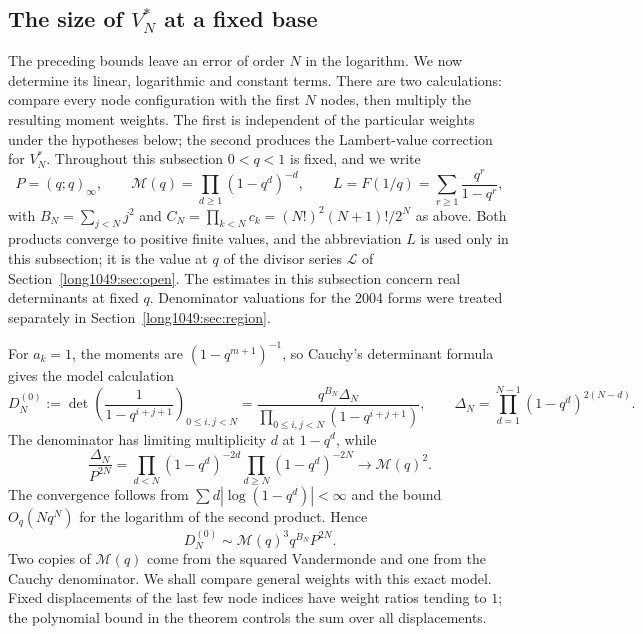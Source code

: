 \documentclass[11pt]{article}
\begin{document}
\subsection{The size of \texorpdfstring{$V_N^*$}{V(N)} at a fixed base}
\label{long1049:sec:sharp-fixed-base}

The preceding bounds leave an error of order $N$ in the logarithm.
We now determine its linear, logarithmic and constant terms. There
are two calculations: compare every node configuration with the
first $N$ nodes, then multiply the resulting moment weights.
The first is independent of the particular weights under the
hypotheses below; the second produces the Lambert-value correction
for $V_N^*$. Throughout this subsection $0<q<1$ is fixed, and we write
\[
 P=(q;q)_\infty,\qquad
 \mathcal M(q)=\prod_{d\ge1}(1-q^d)^{-d},\qquad
 L=F(1/q)=\sum_{r\ge1}\frac{q^r}{1-q^r},
\]
with $B_N=\sum_{j<N}j^2$ and $C_N=\prod_{k<N}c_k=(N!)^2(N+1)!/2^N$ as above.
Both products converge to positive finite values, and the abbreviation $L$ is
used only in this subsection; it is the value at $q$ of the divisor series
$\mathcal L$ of Section~\ref{long1049:sec:open}.
The estimates in this subsection concern real determinants at fixed
$q$. Denominator valuations for the 2004 forms were treated separately
in Section~\ref{long1049:sec:region}.

For $a_k=1$, the moments are $(1-q^{m+1})^{-1}$, so Cauchy's
determinant formula gives the model calculation
\begin{equation}\label{long1049:eq:cauchy-model}
 D_N^{(0)}:=\det\left(\frac1{1-q^{i+j+1}}\right)_{0\le i,j<N}
 =\frac{q^{B_N}\Delta_N}{\prod_{0\le i,j<N}(1-q^{i+j+1})},
 \qquad
 \Delta_N=\prod_{d=1}^{N-1}(1-q^d)^{2(N-d)}.
\end{equation}
The denominator has limiting multiplicity $d$ at $1-q^d$, while
\[
 \frac{\Delta_N}{P^{2N}}
 =\prod_{d<N}(1-q^d)^{-2d}\prod_{d\ge N}(1-q^d)^{-2N}
 \longrightarrow\mathcal M(q)^2.
\]
The convergence follows from $\sum d|\log(1-q^d)|<\infty$ and the
bound $O_q(Nq^N)$ for the logarithm of the second product. Hence
\begin{equation}\label{long1049:eq:cauchy-model-limit}
 D_N^{(0)}\sim\mathcal M(q)^3q^{B_N}P^{2N}.
\end{equation}
Two copies of $\mathcal M(q)$ come from the squared Vandermonde
and one from the Cauchy denominator. We shall compare general
weights with this exact model. Fixed displacements of the last
few node indices have weight ratios tending to $1$; the polynomial
bound in the theorem controls the sum over all displacements.
\end{document}
